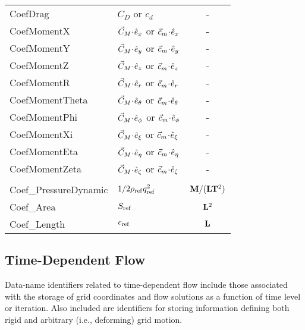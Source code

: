 \begin{longtable}{>{\ttfamily}l >{\quad}l >{\quad}c}
CoefDrag              & $C_D$ or $c_d$                                 & - \\
CoefMomentX           & ${\vec{C}}_M \!\cdot\! \hat{e}_x$ or ${\vec{c}}_m \!\cdot\! \hat{e}_x$         & - \\
CoefMomentY           & ${\vec{C}}_M \!\cdot\! \hat{e}_y$ or ${\vec{c}}_m \!\cdot\! \hat{e}_y$         & - \\
CoefMomentZ           & ${\vec{C}}_M \!\cdot\! \hat{e}_z$ or ${\vec{c}}_m \!\cdot\! \hat{e}_z$         & - \\
CoefMomentR           & ${\vec{C}}_M \!\cdot\! {{\hat{e}}_r}$ or ${\vec{c}}_m \!\cdot\! {{\hat{e}}_r}$       & - \\
CoefMomentTheta       & ${\vec{C}}_M \!\cdot\! {{\hat{e}}_\theta}$ or ${\vec{c}}_m \!\cdot\! {{\hat{e}}_\theta}$     & - \\
CoefMomentPhi         & ${\vec{C}}_M \!\cdot\! {{\hat{e}}_\phi}$ or ${\vec{c}}_m \!\cdot\! {{\hat{e}}_\phi}$   & - \\
CoefMomentXi          & ${\vec{C}}_M \!\cdot\! {{\hat{e}}_\xi}$ or ${\vec{c}}_m \!\cdot\! {{\hat{e}}_\xi}$     & - \\
CoefMomentEta         & ${\vec{C}}_M \!\cdot\! {{\hat{e}}_\eta}$ or ${\vec{c}}_m \!\cdot\! {{\hat{e}}_\eta}$   & - \\
CoefMomentZeta        & ${\vec{C}}_M \!\cdot\! {{\hat{e}}_\zeta}$ or ${\vec{c}}_m \!\cdot\! {{\hat{e}}_\zeta}$ & - \\
\\
Coef\_PressureDynamic & ${1/2} \rho_{\rm ref} q_{\rm ref}^2$ & ${\bf M}/({\bf L} {\bf T}^2)$ \\
Coef\_Area            & $S_{\rm ref}$                     & ${\bf L}^2$ \\
Coef\_Length          & $c_{\rm ref}$                     & ${\bf L}$
\end{longtable}

\newpage
\subsection{Time-Dependent Flow}

Data-name identifiers related to time-dependent flow include those
associated with the storage of grid coordinates and flow solutions
as a function of time level or iteration.
Also included are identifiers for storing information defining
both rigid and arbitrary (i.e., deforming) grid motion.

